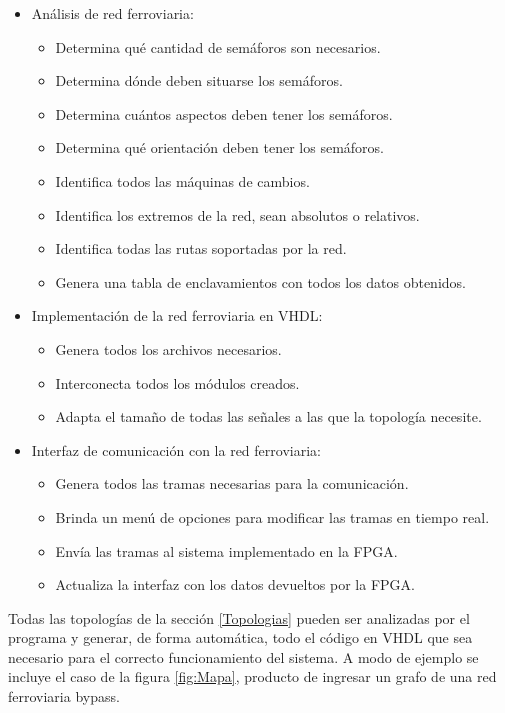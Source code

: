 	\begin{itemize}
		\item Análisis de red ferroviaria:
		\begin{itemize}
			\item Determina qué cantidad de semáforos son necesarios.
			\item Determina dónde deben situarse los semáforos.
			\item Determina cuántos aspectos deben tener los semáforos.
			\item Determina qué orientación deben tener los semáforos.
			\item Identifica todos las máquinas de cambios.
			\item Identifica los extremos de la red, sean absolutos o relativos.
			\item Identifica todas las rutas soportadas por la red.
			\item Genera una tabla de enclavamientos con todos los datos obtenidos.
		\end{itemize}
		\item Implementación de la red ferroviaria en VHDL:
		\begin{itemize}
			\item Genera todos los archivos necesarios.
			\item Interconecta todos los módulos creados.
			\item Adapta el tamaño de todas las señales a las que la topología necesite.
		\end{itemize}
		\item Interfaz de comunicación con la red ferroviaria:
		\begin{itemize}
			\item Genera todos las tramas necesarias para la comunicación.
			\item Brinda un menú de opciones para modificar las tramas en tiempo real.
			\item Envía las tramas al sistema implementado en la FPGA.
			\item Actualiza la interfaz con los datos devueltos por la FPGA.
		\end{itemize}
	\end{itemize}
	
	Todas las topologías de la sección \ref{Topologias} pueden ser analizadas por el programa y generar, de forma automática, todo el código en VHDL que sea necesario para el correcto funcionamiento del sistema. A modo de ejemplo se incluye el caso de la figura \ref{fig:Mapa}, producto de ingresar un grafo de una red ferroviaria bypass.	

